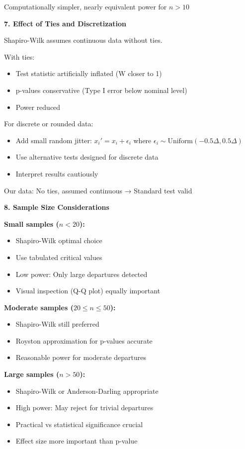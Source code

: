 \documentclass[12pt]{article}
\begin{document}
\begin{explanation}
Computationally simpler, nearly equivalent power for $n > 10$

\textbf{7. Effect of Ties and Discretization}

Shapiro-Wilk assumes continuous data without ties.

With ties:
\begin{itemize}
\item Test statistic artificially inflated (W closer to 1)
\item p-values conservative (Type I error below nominal level)
\item Power reduced
\end{itemize}

For discrete or rounded data:
\begin{itemize}
\item Add small random jitter: $x_i' = x_i + \epsilon_i$ where $\epsilon_i \sim \text{Uniform}(-0.5\Delta, 0.5\Delta)$
\item Use alternative tests designed for discrete data
\item Interpret results cautiously
\end{itemize}

Our data: No ties, assumed continuous → Standard test valid

\textbf{8. Sample Size Considerations}

\textbf{Small samples ($n < 20$):}
\begin{itemize}
\item Shapiro-Wilk optimal choice
\item Use tabulated critical values
\item Low power: Only large departures detected
\item Visual inspection (Q-Q plot) equally important
\end{itemize}

\textbf{Moderate samples ($20 \leq n \leq 50$):}
\begin{itemize}
\item Shapiro-Wilk still preferred
\item Royston approximation for p-values accurate
\item Reasonable power for moderate departures
\end{itemize}

\textbf{Large samples ($n > 50$):}
\begin{itemize}
\item Shapiro-Wilk or Anderson-Darling appropriate
\item High power: May reject for trivial departures
\item Practical vs statistical significance crucial
\item Effect size more important than p-value
\end{itemize}


\end{explanation}
\end{document}

